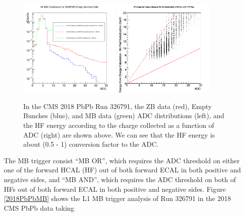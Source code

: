 \begin{figure}[hbtp]
\begin{center}
\includegraphics[width=0.45\textwidth]{Figures/Chapter2/AllADC.png}
\includegraphics[width=0.45\textwidth]{Figures/Chapter2/HFvsADC.png}
\caption{In the CMS 2018 PbPb Run 326791, the ZB data (red), Empty Bunches (blue), and MB data (green) ADC distributions (left), and the HF energy according to the charge collected as a function of ADC (right) are shown above. We can see that the HF energy  is about (0.5 - 1) conversion factor to the ADC.}
\label{HFADC}
\end{center}
\end{figure} 

The MB trigger consist ``MB OR'', which requires the ADC threshold on either one of the forward HCAL (HF) out of both forward ECAL in both positive and negative sides, and ``MB AND'',  which requires the ADC threshold on both of HFs out of both forward ECAL in both positive and negative sides. Figure \ref{2018PbPbMB} shows the L1 MB trigger analysis of Run 326791 in the 2018 CMS PbPb data taking 

